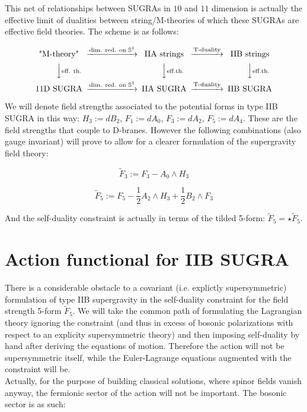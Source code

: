 \documentclass[11pt,a4paper,twoside,openright]{book}
\begin{document}
This net of relationships between SUGRAs in $10$ and $11$ dimension is actually the effective limit of dualities between string/M-theories of which these SUGRAs are effective field theories. The scheme is as follows:

\[\begin{CD}
\text{"M-theory"}     @> \text{dim. red. on }\mathbb{S}^1>>  \text{IIA strings} @> \text{T-duality} >> \text{IIB strings} \\
@VV\text{eff. th.}V        @VV\text{eff.th.}V  @VV \text{eff.th.} V\\
\text{11D SUGRA}     @> \text{dim. red. on }\mathbb{S}^1>> \text{IIA SUGRA} @> \text{T-duality}>>  \text{IIB SUGRA}
\end{CD}\]

We will denote field strengths associated to the potential forms in type IIB SUGRA in this way: $H_3 := dB_2$, $F_1 := dA_0$, $F_3 := dA_2$, $F_5 := dA_4$. These are the field strengths that couple to D-branes. However the following combinations (also gauge invariant) will prove to allow for a clearer formulation of the supergravity field theory:

\[ \tilde{F}_3 := F_3 - A_0 \wedge H_3 \]

\[ \tilde{F}_5 := F_5 - \frac{1}{2} A_2 \wedge H_3 + \frac{1}{2} B_2 \wedge F_3 \]

And the self-duality constraint is actually in terms of the tilded 5-form: $\tilde{F}_5 = \star \tilde{F}_5$.

\section{Action functional for IIB SUGRA}

There is a considerable obstacle to a covariant (i.e. explictly supersymmetric) formulation of type IIB supergravity in the self-duality constraint for the field strength 5-form $\tilde{F}_5$. We will take the common path of formulating the Lagrangian theory ignoring the constraint (and thus in excess of bosonic polarizations with respect to an explicity supersymmetric theory) and then imposing self-duality by hand after deriving the equations of motion. Therefore the action will not be supersymmetric itself, while the Euler-Lagrange equations augmented with the constraint will be.\\

Actually, for the purpose of building classical solutions, where spinor fields vanish anyway, the fermionic sector of the action will not be important. The bosonic sector is as such:
\end{document}
